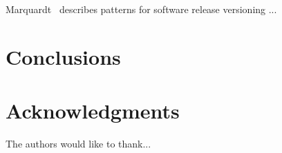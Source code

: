 \documentclass[conference]{IEEEtran}
\begin{document}
Marquardt~\cite{Marquardt2010:EuroPLoP} describes patterns for software release versioning ...


\section{Conclusions}


\section*{Acknowledgments}

The authors would like to thank...

%

\end{document}
